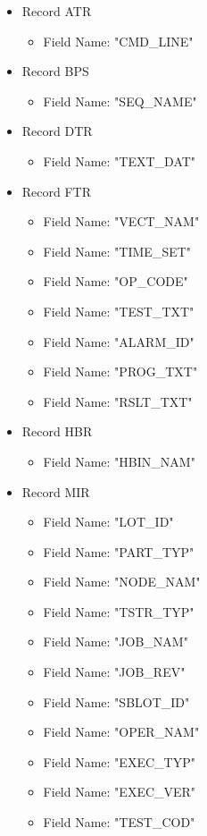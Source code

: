 \documentclass[letterpaper]{article}
\begin{document}
\begin{itemize}
\item Record ATR
    \begin{itemize}
    \item Field Name: "CMD\_LINE"
    \end{itemize}
\item Record BPS
    \begin{itemize}
    \item Field Name: "SEQ\_NAME"
    \end{itemize}
\item Record DTR
    \begin{itemize}
    \item Field Name: "TEXT\_DAT"
    \end{itemize}
\item Record FTR
    \begin{itemize}
    \item Field Name: "VECT\_NAM"
    \item Field Name: "TIME\_SET"
    \item Field Name: "OP\_CODE"
    \item Field Name: "TEST\_TXT"
    \item Field Name: "ALARM\_ID"
    \item Field Name: "PROG\_TXT"
    \item Field Name: "RSLT\_TXT"
    \end{itemize}
\item Record HBR
    \begin{itemize}
    \item Field Name: "HBIN\_NAM"
    \end{itemize}
\item Record MIR
    \begin{itemize}
    \item Field Name: "LOT\_ID"
    \item Field Name: "PART\_TYP"
    \item Field Name: "NODE\_NAM"
    \item Field Name: "TSTR\_TYP"
    \item Field Name: "JOB\_NAM"
    \item Field Name: "JOB\_REV"
    \item Field Name: "SBLOT\_ID"
    \item Field Name: "OPER\_NAM"
    \item Field Name: "EXEC\_TYP"
    \item Field Name: "EXEC\_VER"
    \item Field Name: "TEST\_COD"

\end{itemize}
\end{itemize}
\end{document}
